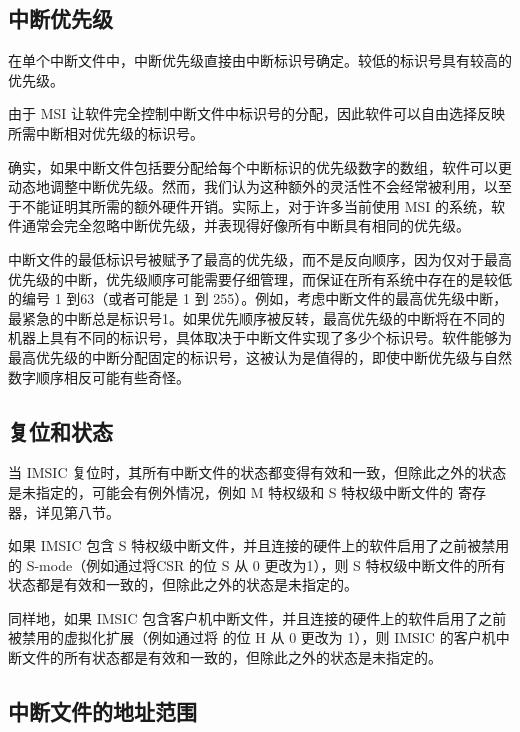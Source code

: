 \begin{translation}
\subsection{中断优先级}

在单个中断文件中，中断优先级直接由中断标识号确定。较低的标识号具有较高的优先级。

\begin{commentary}
    由于 MSI 让软件完全控制中断文件中标识号的分配，因此软件可以自由选择反映所需中断相对优先级的标识号。

    确实，如果中断文件包括要分配给每个中断标识的优先级数字的数组，软件可以更动态地调整中断优先级。然而，我们认为这种额外的灵活性不会经常被利用，以至于不能证明其所需的额外硬件开销。实际上，对于许多当前使用 MSI 的系统，软件通常会完全忽略中断优先级，并表现得好像所有中断具有相同的优先级。
\end{commentary}

\begin{commentary}
    中断文件的最低标识号被赋予了最高的优先级，而不是反向顺序，因为仅对于最高优先级的中断，优先级顺序可能需要仔细管理，而保证在所有系统中存在的是较低的编号 1 到63（或者可能是 1 到 255）。例如，考虑中断文件的最高优先级中断，最紧急的中断总是标识号1。如果优先顺序被反转，最高优先级的中断将在不同的机器上具有不同的标识号，具体取决于中断文件实现了多少个标识号。软件能够为最高优先级的中断分配固定的标识号，这被认为是值得的，即使中断优先级与自然数字顺序相反可能有些奇怪。
\end{commentary}

\subsection{复位和状态}

当 IMSIC 复位时，其所有中断文件的状态都变得有效和一致，但除此之外的状态是未指定的，可能会有例外情况，例如 M 特权级和 S 特权级中断文件的  寄存器，详见第八节。

如果 IMSIC 包含 S 特权级中断文件，并且连接的硬件上的软件启用了之前被禁用的 \mbox{S-mode}（例如通过将CSR  的位 S 从 0 更改为1），则 S 特权级中断文件的所有状态都是有效和一致的，但除此之外的状态是未指定的。

同样地，如果 IMSIC 包含客户机中断文件，并且连接的硬件上的软件启用了之前被禁用的虚拟化扩展（例如通过将  的位 H 从 0 更改为 1），则 IMSIC 的客户机中断文件的所有状态都是有效和一致的，但除此之外的状态是未指定的。

\subsection{中断文件的地址范围}


\end{translation}
